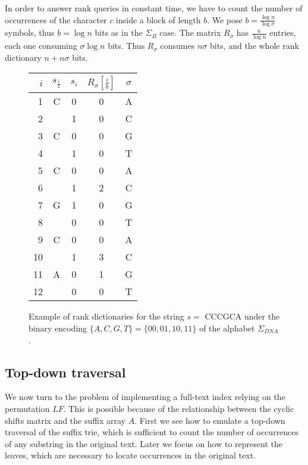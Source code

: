 In order to answer rank queries in constant time, we have to count the number of occurrences of the character $c$ inside a block of length $b$.
We pose $b=\frac{\log{n}}{\log{\sigma}}$ symbols, thus $b=\log{n}$ bits as in the $\Sigma_B$ case.
The matrix $R_{\sigma}$ has $\frac{n}{\log{n}}$ entries, each one consuming $\sigma \log{n}$ bits.
Thus $R_{\sigma}$ consumes $n \sigma$ bits, and the whole rank dictionary $n + n \sigma$ bits.

\begin{figure}[h]
\begin{center}
\caption[Example of rank dictionaries]{Example of rank dictionaries for the string $s=$ {\ttfamily CCCGCA} under the binary encoding $\{ A,C,G,T \} = \{ 00,01,10,11 \}$ of the alphabet $\Sigma_{DNA}$.}
\label{fig:rd_dna}
\ttfamily
\begin{tabular}{rcccc}
$i$	& $s_{\frac{i}{2}}$	& $s_i$ & $R_{\sigma}[\frac{i}{b}]$ & $\sigma$\\
\midrule
1   & C & 0 & 0 & A\\
2   &   & 1 & 0 & C\\
3   & C & 0 & 0 & G\\
4   &   & 1 & 0 & T\\
5   & C & 0 & 0 & A\\
6   &   & 1 & 2 & C\\
7   & G & 1 & 0 & G\\
8   &   & 0 & 0 & T\\
9   & C & 0 & 0 & A\\
10  &   & 1 & 3 & C\\
11  & A & 0 & 1 & G\\
12  &   & 0 & 0 & T\\
\end{tabular}
\end{center}
\end{figure}



\subsection{Top-down traversal}
\label{sub:fmtrie}

We now turn to the problem of implementing a full-text index relying on the permutation $LF$.
This is possible because of the relationship between the cyclic shifts matrix and the suffix array $A$.
First we see how to emulate a top-down traversal of the suffix trie, which is sufficient to count the number of occurrences of any substring in the original text.
Later we focus on how to represent the leaves, which are necessary to locate occurrences in the original text.


